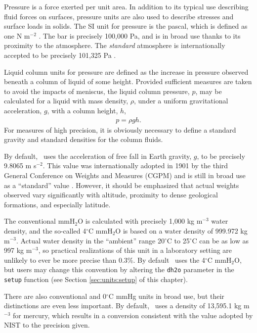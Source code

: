 Pressure is a force exerted per unit area.  In addition to its typical use describing fluid forces on surfaces, pressure units are also used to describe stresses and surface loads in solids.  The SI unit for pressure is the pascal, which is defined as one N m$^{-2}$ \cite{bipm}.  The bar is precisely 100,000 Pa, and is in broad use thanks to its proximity to the atmosphere.  The \emph{standard} atmosphere is internationally accepted to be precisely 101,325 Pa \cite{CPC}.  

Liquid column units for pressure are defined as the increase in pressure observed beneath a column of liquid of some height.  Provided sufficient measures are taken to avoid the impacts of meniscus, the liquid column pressure, $p$, may be calculated for a liquid with mass density, $\rho$, under a uniform gravitational acceleration, $g$, with a column height, $h$,
\begin{align}
p = \rho g h.
\end{align}
For measures of high precision, it is obviously necessary to define a standard gravity and standard densities for the column fluids.

By default, \PM\ uses the acceleration of free fall in Earth gravity, $g$, to be precisely 9.8065 m s$^{-2}$.  This value was internationally adopted in 1901 by the third General Conference on Weights and Measures (CGPM)\cite{cgpm:3:2} and is still in broad use as a ``standard'' value \cite[p.45]{nist:sp1038} \cite[p.5]{nist:811}.  However, it should be emphasized that actual weights observed vary significantly with altitude, proximity to dense geological formations, and especially latitude.  

The conventional mmH$_2$O is calculated with precisely 1,000 kg m$^{-3}$ water density, and the so-called 4$^\circ$C mmH$_2$O is based on a water density of 999.972 kg m$^{-3}$.  Actual water density in the ``ambient'' range 20$^\circ$C to 25$^\circ$C can be as low as 997 kg m$^{-3}$, so practical realizations of this unit in a laboratory setting are unlikely to ever be more precise than 0.3\%.  By default \PM\ uses the 4$^\circ$C mmH$_2$O, but users may change this convention by altering the \verb|dh2o| parameter in the \verb|setup| function (see Section \ref{sec:units:setup} of this chapter).

There are also conventional and 0$^\circ$C mmHg units in broad use, but their distinctions are even less important.  By default, \PM\ uses a density of 13,595.1 kg m$^{-3}$ for mercury, which results in a conversion consistent with the value adopted by NIST \cite[p.52]{nist:sp811} to the precision given.

